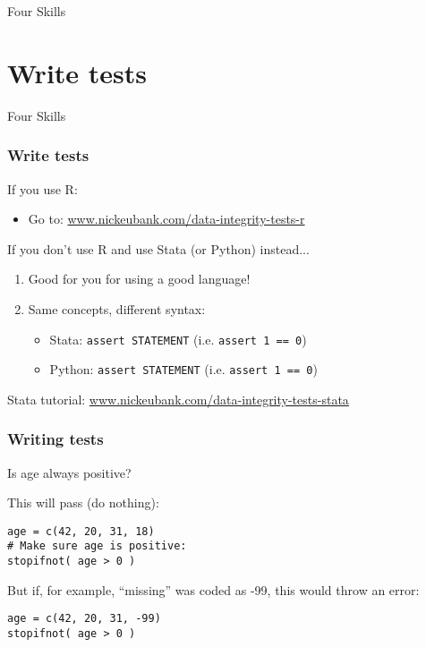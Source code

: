 \documentclass[11pt]{beamer}
\begin{document}
\begin{frame}[c]{Four Skills}
    \tableofcontents
\end{frame}



\section{Write tests}

\begin{frame}[c]{Four Skills}
    \tableofcontents[current]
\end{frame}

\begin{frame}\frametitle{Write tests}
    If you use R:
    \begin{itemize}
        \item Go to: \url{www.nickeubank.com/data-integrity-tests-r}
    \end{itemize}
    \vspace{1cm}
    \pause
    If you don't use R and use Stata (or Python) instead...
    \begin{enumerate}
        \pause \item Good for you for using a good language!
        \pause \item Same concepts, different syntax:
        \begin{itemize}
            \pause \item Stata: \texttt{assert STATEMENT} (i.e. \texttt{assert 1 == 0})
            \pause \item Python: \texttt{assert STATEMENT} (i.e. \texttt{assert 1 == 0})
        \end{itemize}
    \end{enumerate}
    \vspace{1cm}
    \pause Stata tutorial: \url{www.nickeubank.com/data-integrity-tests-stata}
\end{frame}

\begin{frame}[fragile]\frametitle{Writing tests}
Is age always positive?

\vspace{1cm}
This will pass (do nothing):
\begin{verbatim}
age = c(42, 20, 31, 18)
# Make sure age is positive:
stopifnot( age > 0 )
\end{verbatim}

\vspace{1cm}
But if, for example, ``missing'' was coded as -99, this would throw an error:
\begin{verbatim}
age = c(42, 20, 31, -99)
stopifnot( age > 0 )
\end{verbatim}
\end{frame}
\end{document}
